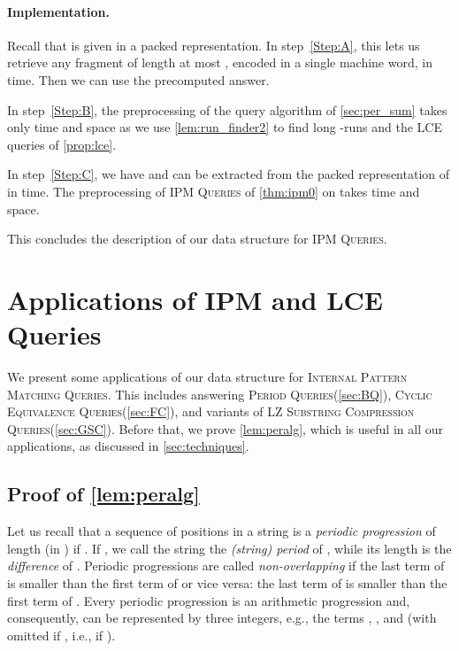 \documentclass[a4paper]{article}
\theoremstyle{definition}
\theoremstyle{remark}
\newcommand{\IPMFull}{\textsc{Internal Pattern Matching Queries}\xspace}
\newcommand{\IPM}{\textsc{IPM Queries}\xspace}
\newcommand{\PQ}{\textsc{Period Queries}\xspace}
\newcommand{\FC}{\textsc{Cyclic Equivalence Queries}\xspace}
\newcommand{\LSC}{\textsc{LZ Substring Compression Queries}\xspace}
\begin{document}
\paragraph*{Implementation.}
Recall that  is given in a packed representation.
In step~\ref{Step:A}, this lets us retrieve any fragment of length at most , encoded in a single machine word, in  time.
Then we can use the precomputed answer.

In step~\ref{Step:B}, the preprocessing of the query algorithm of \cref{sec:per_sum} takes only  time and space as we use \cref{lem:run_finder2} to find long -runs and the LCE queries of \cref{prop:lce}.

In step~\ref{Step:C}, we have  and  can be extracted from the packed representation of  in  time.
The preprocessing of \IPM of \cref{thm:ipm0} on  takes  time and space.

\medskip
\noindent
This concludes the description of our data structure for \IPM.

\thmipm*

\section{Applications of IPM and LCE Queries}\label{chp:app}
We present some applications of our data structure for \IPMFull.
This includes answering \PQ (\cref{sec:BQ}), \FC (\cref{sec:FC}), and variants of \LSC (\cref{sec:GSC}).
Before that, we prove \cref{lem:peralg}, which is useful in all our applications, as discussed in \cref{sec:techniques}.

\subsection{Proof of \cref{lem:peralg}}\label{sec:app:comb}

Let us recall that a sequence  of positions  in a string 
is a  \emph{periodic progression} of length  (in ) if .
If , we call the string   the \emph{(string) period} of , while its length  is the \emph{difference} of .
Periodic progressions  are called \emph{non-overlapping} if the last term of  is smaller than the first term of  or vice versa: the last term of  is smaller than the first term of .
Every periodic progression is an arithmetic progression and, consequently, can be represented by three integers,
e.g., the terms , , and  (with  omitted if , i.e., if ).
\end{document}
